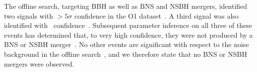 
The offline search, targeting \ac{BBH} as well as \ac{BNS} and \ac{NSBH} mergers, identified
two signals with $> 5 \sigma$ confidence in the \ac{O1} dataset~\citep{Abbott:2016blz,Abbott:2016nmj}. A third signal was
also identified with \LVBLAHsignificance\ confidence~\citep{TheLIGOScientific:2016pea, TheLIGOScientific:2016qqj}. Subsequent
parameter inference on all three of these events has determined that, to very high
confidence, they were not produced by a \ac{BNS} or \ac{NSBH} merger~\citep{TheLIGOScientific:2016wfe, TheLIGOScientific:2016pea}. No other events
are significant with respect to the noise background in the offline search~\citep{TheLIGOScientific:2016pea}, and
we therefore state that no \ac{BNS} or \ac{NSBH} mergers were observed.
